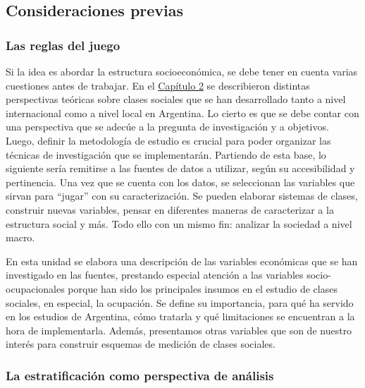 \documentclass[
]{article}
\begin{document}
\hypertarget{consideraciones}{%
\subsection{Consideraciones previas}\label{consideraciones}}

\hypertarget{las-reglas-del-juego}{%
\subsubsection{Las reglas del juego}\label{las-reglas-del-juego}}

Si la idea es abordar la estructura socioeconómica, se debe tener en cuenta varias cuestiones antes de trabajar. En el \protect\hyperlink{estructura1}{Capítulo 2} se describieron distintas perspectivas teóricas sobre clases sociales que se han desarrollado tanto a nivel internacional como a nivel local en Argentina. Lo cierto es que se debe contar con una perspectiva que se adecúe a la pregunta de investigación y a objetivos. Luego, definir la metodología de estudio es crucial para poder organizar las técnicas de investigación que se implementarán. Partiendo de esta base, lo siguiente sería remitirse a las fuentes de datos a utilizar, según su accesibilidad y pertinencia. Una vez que se cuenta con los datos, se seleccionan las variables que sirvan para ``jugar'' con su caracterización. Se pueden elaborar sistemas de clases, construir nuevas variables, pensar en diferentes maneras de caracterizar a la estructura social y más. Todo ello con un mismo fin: analizar la sociedad a nivel macro.

En esta unidad se elabora una descripción de las variables económicas que se han investigado en las fuentes, prestando especial atención a las variables socio-ocupacionales porque han sido los principales insumos en el estudio de clases sociales, en especial, la ocupación. Se define su importancia, para qué ha servido en los estudios de Argentina, cómo tratarla y qué limitaciones se encuentran a la hora de implementarla. Además, presentamos otras variables que son de nuestro interés para construir esquemas de medición de clases sociales.

\hypertarget{la-estratificaciuxf3n-como-perspectiva-de-anuxe1lisis}{%
\subsubsection{La estratificación como perspectiva de análisis}\label{la-estratificaciuxf3n-como-perspectiva-de-anuxe1lisis}}
\end{document}
